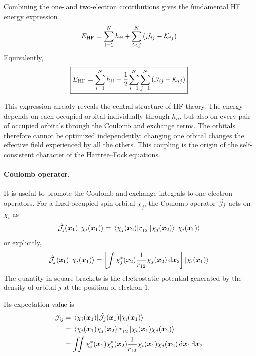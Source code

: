 \documentclass[11pt,a4paper,titlepage]{article}
\numberwithin{equation}{section}
\newcommand{\EHF}{E_\text{HF}}
\newcommand{\bx}{\boldsymbol{x}}
\newcommand{\chJ}{\Hat{\mathcal{J}}}
\newcommand{\cJ}{\mathcal{J}}
\newcommand{\cK}{\mathcal{K}}
\begin{document}
Combining the one- and two-electron contributions gives the fundamental HF
energy expression
\begin{equation}
  \EHF
  =
  \sum_{i=1}^{N}h_{ii}
  +
  \sum_{i<j}^{N}
  \qty(
    \cJ_{ij}-\cK_{ij}
  )
  \label{eq:hf-energy-spin-orbitals}
\end{equation}
Equivalently,
\begin{equation}
  \boxed{
  \EHF
  =
  \sum_{i=1}^{N}h_{ii}
  +
  \frac{1}{2}
  \sum_{i=1}^{N}
  \sum_{j=1}^{N}
  \qty(
    \cJ_{ij}-\cK_{ij}
  )
  }
  \label{eq:hf-energy-spin-orbitals-double}
\end{equation}

This expression already reveals the central structure of HF theory. The
energy depends on each occupied orbital individually through $h_{ii}$, but
also on every pair of occupied orbitals through the Coulomb and exchange
terms. The orbitals therefore cannot be optimized independently: changing
one orbital changes the effective field experienced by all the others. This
coupling is the origin of the self-consistent character of the Hartree--Fock
equations.

\paragraph{Coulomb operator.}

It is useful to promote the Coulomb and exchange integrals to one-electron
operators. For a fixed occupied spin orbital $\chi_j$, the Coulomb operator
$\chJ_j$ acts on $\chi_i$ as
\begin{equation}
  \chJ_j(\bx_1)\ket{\chi_i(\bx_1)}
  =
  \mel{\chi_j(\bx_2)}{r_{12}^{-1}}{\chi_j(\bx_2)}
  \ket{\chi_i(\bx_1)}
\end{equation}
or explicitly,
\begin{equation}
  \chJ_j(\bx_1)\ket{\chi_i(\bx_1)}
  =
  \qty[
    \int
    \chi_j^*(\bx_2)
    \frac{1}{r_{12}}
    \chi_j(\bx_2)
    \dd{\bx_2}
  ]
  \ket{\chi_i(\bx_1)}
  \label{eq:coulomb-operator}
\end{equation}
The quantity in square brackets is the electrostatic potential generated by
the density of orbital $j$ at the position of electron $1$.

Its expectation value is
\begin{equation}
\begin{split}
  \cJ_{ij}
  &=
  \mel{\chi_i(\bx_1)}
       {\chJ_j(\bx_1)}
       {\chi_i(\bx_1)}
  \\
  &=
  \mel{\chi_i(\bx_1)\chi_j(\bx_2)}
       {r_{12}^{-1}}
       {\chi_i(\bx_1)\chi_j(\bx_2)}
  \\
  &=
  \iint
  \chi_i^*(\bx_1)
  \chi_j^*(\bx_2)
  \frac{1}{r_{12}}
  \chi_i(\bx_1)
  \chi_j(\bx_2)
  \dd{\bx_1}\dd{\bx_2}
\end{split}
\end{equation}
\end{document}
